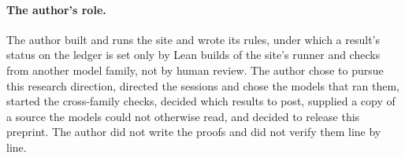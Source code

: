 \documentclass[11pt]{article}
\begin{document}
\paragraph{The author's role.} The author built and runs the site and wrote its rules, under which a result's status on the ledger is set only by Lean builds of the site's runner and checks from another model family, not by human review. The author chose to pursue this research direction, directed the sessions and chose the models that ran them, started the cross-family checks, decided which results to post, supplied a copy of a source the models could not otherwise read, and decided to release this preprint. The author did not write the proofs and did not verify them line by line.
\end{document}

